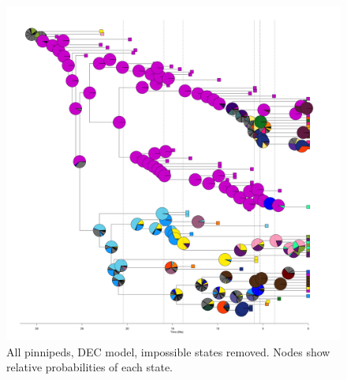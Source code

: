 \documentclass[a4paper, 12pt]{article}
\begin{document}
\begin{figure}[H]
 \centering
  \includegraphics[width = \linewidth]{figures/all-pinnipeds-DEC-impossible-pies.png}
  \caption{All pinnipeds, DEC model, impossible states removed. Nodes show relative probabilities of each state.}
  \label{fig-all-dec-pie}
\end{figure} 


 

\end{document}
